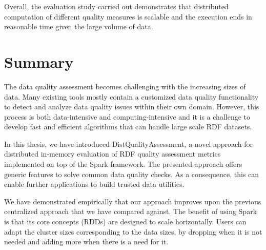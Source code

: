 Overall, the evaluation study carried out demonstrates that distributed computation of  different quality measures is scalable and the execution ends in reasonable time given the large volume of data.


\section{Summary}
\label{sec:distqualityassesment-summary}
The data quality assessment becomes challenging with the increasing sizes of data.
Many existing tools mostly contain a customized data quality functionality to detect and analyze data quality issues within their own domain. 
However, this process is both data-intensive and computing-intensive and it is a challenge to develop fast and efficient algorithms that can handle large scale \gls{RDF} datasets.

In this thesis, we have introduced DistQualityAssessment, a novel approach for distributed in-memory evaluation of \gls{RDF} quality assessment metrics implemented on top of the Spark framework.
The presented approach offers generic features to solve common data quality checks.
As a consequence, this can enable further applications to build trusted data utilities. 

We have demonstrated empirically that our approach improves upon the previous centralized approach that we have compared against.
The benefit of using Spark is that its core concepts (\gls{RDD}s) are designed to scale horizontally. 
Users can adapt the cluster sizes corresponding to the data sizes, by dropping when it is not needed and adding more when there is a need for it.